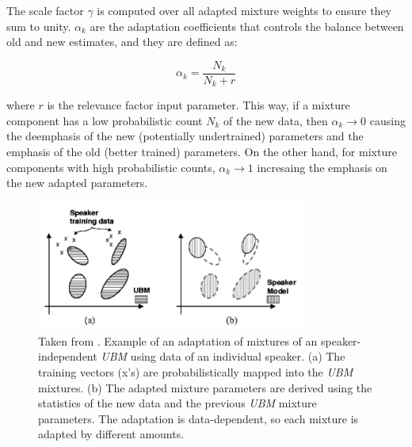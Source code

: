 The scale factor $\gamma$ is computed over all adapted mixture weights to ensure they sum to unity.
$\alpha_{k}$ are the adaptation coefficients that controls the balance between old and new
estimates, and they are defined as:

\begin{equation}
	\alpha_{k} = \frac{N_{k}}{N_{k} + r}
\end{equation}

where $r$ is the relevance factor input parameter. This way, if a mixture component has a low
probabilistic count $N_{k}$ of the new data, then $\alpha_{k} \to 0$ causing the deemphasis
of the new (potentially undertrained) parameters and the emphasis of the old (better trained)
parameters. On the other hand, for mixture components with high probabilistic counts,
$\alpha_{k} \to 1$ incresaing the emphasis on the new adapted parameters.

\begin{figure}[H]
	\centering
	\includegraphics[width=0.8\textwidth]{files/figures/method/gmm-adaptation}
	\caption{Taken from \cite{ubm_adaptation}. Example
	of an adaptation of mixtures of an speaker-independent \textit{UBM} using data of an
	individual speaker. (a) The training vectors (x's) are probabilistically mapped into
	the \textit{UBM} mixtures. (b) The adapted mixture parameters are derived using the
	statistics of the new data and the previous \textit{UBM} mixture parameters. The
	adaptation is data-dependent, so each mixture is adapted by different amounts.}
\end{figure}

